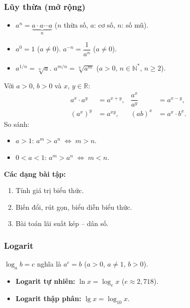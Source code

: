 \documentclass[12pt,a4paper]{article}
\begin{document}
\subsubsection{Lũy thừa (mở rộng)}

\begin{dinhnghia}
  \begin{itemize}
    \item $a^n = \underbrace{a \cdot a \cdots a}_{n}$ \;($n$ thừa số, $a$: cơ số, $n$: số mũ).
    \item $a^0 = 1$ \;($a \ne 0$). \quad $a^{-n} = \dfrac{1}{a^n}$ \;($a \ne 0$).
    \item $a^{1/n} = \sqrt[n]{a}$. \quad $a^{m/n} = \sqrt[n]{a^m}$ \;($a > 0$, $n \in \mathbb{N}^*$, $n \ge 2$).
  \end{itemize}
\end{dinhnghia}

\begin{congthuc}[title={Tính chất lũy thừa}]
  Với $a > 0$, $b > 0$ và $x,\, y \in \mathbb{R}$:
  \begin{align*}
    a^x \cdot a^y &= a^{x+y}, &
    \dfrac{a^x}{a^y} &= a^{x-y}, \\
    (a^x)^y &= a^{xy}, &
    (ab)^x &= a^x \cdot b^x.
  \end{align*}
  So sánh:
  \begin{itemize}
    \item $a > 1$: \;$a^m > a^n \;\Leftrightarrow\; m > n$.
    \item $0 < a < 1$: \;$a^m > a^n \;\Leftrightarrow\; m < n$.
  \end{itemize}
\end{congthuc}

\medskip\noindent\textbf{Các dạng bài tập:}
\begin{enumerate}[label=\textbf{Dạng \arabic*:}, leftmargin=*, align=left]
  \item Tính giá trị biểu thức.
  \item Biến đổi, rút gọn, biểu diễn biểu thức.
  \item Bài toán lãi suất kép -- dân số.
\end{enumerate}

\subsubsection{Logarit}

\begin{dinhnghia}
  $\log_a b = c$ nghĩa là $a^c = b$ \;($a > 0$, $a \ne 1$, $b > 0$).
  \begin{itemize}
    \item \textbf{Logarit tự nhiên:} $\ln x = \log_e x$ \;($e \approx 2{,}718$).
    \item \textbf{Logarit thập phân:} $\lg x = \log_{10} x$.
  \end{itemize}
\end{dinhnghia}
\end{document}

